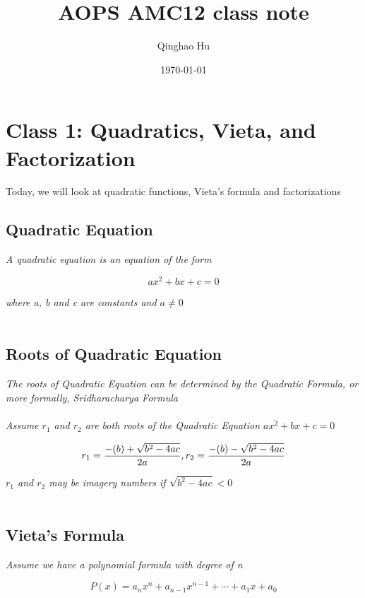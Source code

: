 \documentclass{article}
\title{AOPS AMC12 class note}
\author{Qinghao Hu}
\date{\today}
\begin{document}
\maketitle
\newpage

\section{Class 1: Quadratics, Vieta, and Factorization}
Today, we will look at quadratic functions, Vieta's formula and factorizations

\subsection{Quadratic Equation}

\textit{A quadratic equation is an equation of the form}

\begin{equation}
	ax^2 + bx + c = 0
\end{equation}

\textit{where a, b and c are constants and $a \ne 0$ }
\\\\

\subsection{Roots of Quadratic Equation}

\textit{The roots of Quadratic Equation can be determined by the Quadratic Formula, or more formally, Sridharacharya Formula}
\\
\\
\textit{Assume $r_1$ and $r_2$ are both roots of the Quadratic Equation $ax^2 + bx + c = 0$}

\begin{equation}
	r_1 = {{-(b) + \sqrt{b^2 - 4ac}} \over 2a}, r_2 = {{-(b) - \sqrt{b^2 - 4ac}} \over 2a}
\end{equation}

\textit{$r_1$ and $r_2$ may be imagery numbers if $\sqrt{b^2 - 4 a c} < 0$}
\\\\

\subsection{Vieta's Formula}
\textit{Assume we have a polynomial formula with degree of n}

\begin{equation}
	P(x) = a_n{x^n} + a_{n - 1}{x^{n-1}} + \cdots + a_1x + a_0
\end{equation}
\end{document}
